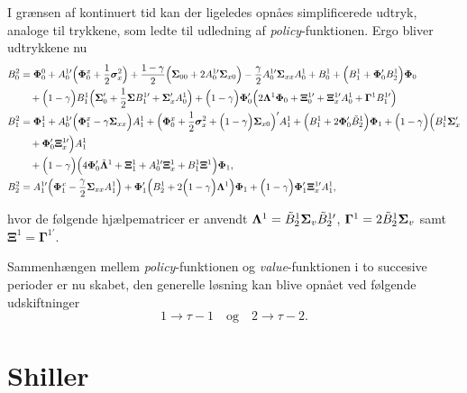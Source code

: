 \documentclass[
  a4paper,
  oneside]{memoir}
\begin{document}
I grænsen af kontinuert tid kan der ligeledes opnåes simplificerede udtryk, analoge til trykkene, som ledte til udledning af \emph{policy}-funktionen. Ergo bliver udtrykkene nu
\begin{align*}
B_0^2&=\bm{\Phi}_0^0 + A_0^{1\prime} \Big(\bm{\Phi}_0^x + \frac{1}{2}\bm{\sigma}_x^2\Big) + \frac{1-\gamma}{2} \Big(\bm{\Sigma}_{00}+ 2A_0^{1\prime} \bm{\Sigma}_{x0}\Big) - \frac{\gamma}{2} A_0^{1\prime} \bm{\Sigma}_{xx} A_0^1 + B_0^1 + \Big(B_1^1 + \bm{\Phi}_0' B_2^1\Big) \bm{\Phi }_0\\
&\quad + \Big(1-\gamma\Big)B_1^1 \Big(\bm{\Sigma}_0' + \frac{1}{2} \bm{\Sigma} B_1^{1\prime} + \bm{\Sigma}_x' A_0^1\Big) + \Big(1-\gamma\Big) \bm{\Phi}_0' \Big(2\bm{\Lambda}^1 \bm{\Phi}_0 + \bm{\Xi}_0^{1\prime} + \bm{\Xi}_x^{1\prime} A_0^1 + \bm{\Gamma}^1 B_1^{1\prime}\Big)\\
B_1^2&=\bm{\Phi}_1^1 + A_0^{1\prime} \Big(\bm{\Phi}_1^x -\gamma\bm{\Sigma}_{xx}\Big) A_1^1 + \Big(\bm{\Phi}_0^x + \frac{1}{2}\bm{\sigma}_x^2 + \Big(1-\gamma\Big) \bm{\Sigma}_{x0}\Big)' A_1^1 + \Big(B_1^1 + 2\bm{\Phi}_0' \Tilde{B}_2^1\Big)\bm{\Phi}_1 + \Big(1-\gamma\Big) \Big(B_1^1\bm{\Sigma}_x'\\
&\quad + \bm{\Phi}_0' \bm{\Xi}_{x}^{1\prime}\Big) A_1^1\\
&\quad + \Big(1-\gamma\Big) \Big(4 \bm{\Phi}_0' \Tilde{\bm{\Lambda}}^1 + \bm{\Xi}_1^1 + A_0^{1\prime} \bm{\Xi}_x^1 + B_1^1 \bm{\Xi}^1\Big)\bm{\Phi}_1,\\
B_2^2&= A_1^{1\prime} \Big(\bm{\Phi}_1^x - \frac{\gamma}{2} \bm{\Sigma}_{xx} A_1^1\Big) + \bm{\Phi}_1' \Big(B_2^1 + 2\Big(1-\gamma\Big) \bm{\Lambda}^1\Big) \bm{\Phi}_1 + \Big(1-\gamma\Big) \bm{\Phi}_1' \bm{\Xi}_x^{1\prime} A_1^1,
\end{align*}

hvor de følgende hjælpematricer er anvendt \(\bm{\Lambda}^1=\Tilde{B}_2^{1}\bm{\Sigma}_v \Tilde{B}_2^{1\prime}\), \(\bm{\Gamma}^1=2\Tilde{B}_2^{1}\bm{\Sigma}_v\) samt \(\bm{\Xi}^1=\bm{\Gamma}^{1\prime}\).

Sammenhængen mellem \emph{policy}-funktionen og \emph{value}-funktionen i to succesive perioder er nu skabet, den generelle løsning kan blive opnået ved følgende udskiftninger
\begin{equation*}
1\to \tau-1\quad\text{og}\quad 2\to \tau-2.
\end{equation*}

\hypertarget{shiller}{%
\chapter{Shiller}\label{shiller}}

\nocite{*}

  
\end{document}
